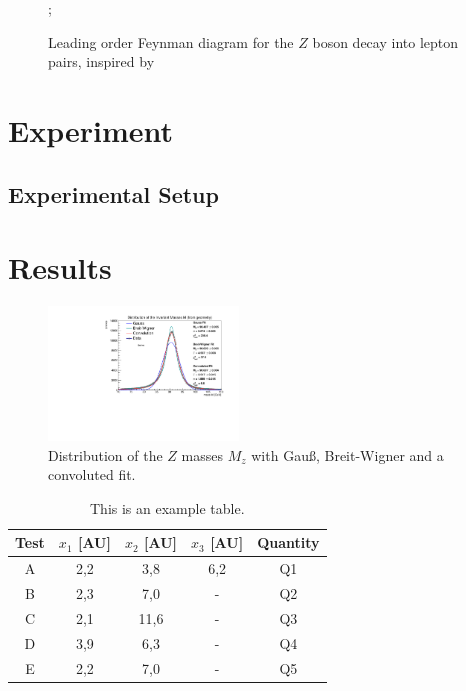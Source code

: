 \documentclass[twocolumn,
			   showpacs,%
               nofootinbib,
               aps,%
               prd,
               notitlepage,
               showkeys,
               10pt]{revtex4-1}
\begin{document}
\begin{figure}[H]
\centering
	
;

\caption{Leading order Feynman diagram for the $Z$ boson decay into lepton pairs, inspired by \cite{PPMasterclass}}
\end{figure}




\section{Experiment}




\subsection{Experimental Setup}


\blindtext




\section{Results}
\blindtext


\begin{figure}[H]
	\centering
	\includegraphics[width = 0.45\textwidth]{figures/plots/ZMassFitted}
	\caption{Distribution of the $Z$ masses $M_z$ with Gau\ss, Breit-Wigner and a convoluted fit.}
\end{figure}

\begin{table}[!htbp]
\centering
\setlength{\tabcolsep}{2mm}
\renewcommand{\arraystretch}{1.5}
\begin{tabular}{|c||c|c|c|c|}
\hline
Test & $x_1$ [AU] & $x_2$ [AU] & $x_3$ [AU] & Quantity \\ \hline \hline
A & 2,2 & 3,8 & 6,2 & Q1 \\
\hline
B & 2,3 & 7,0 & - & Q2 \\
\hline
C & 2,1 & 11,6 & - & Q3 \\
\hline
D & 3,9 & 6,3 & - & Q4\\
\hline
E & 2,2 & 7,0 & - & Q5 \\
\hline
\end{tabular}
\caption{\label{tab:test}This is an example table.}
\end{table}
\end{document}
